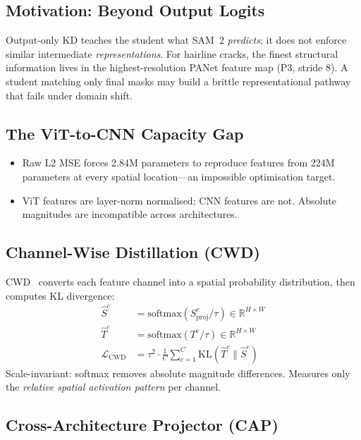 \documentclass[12pt,a4paper]{article}
\begin{document}
\subsection{Motivation: Beyond Output Logits}

Output-only KD teaches the student what SAM~2 \emph{predicts}; it does not
enforce similar intermediate \emph{representations}.
For hairline cracks, the finest structural information lives in the
highest-resolution PANet feature map (P3, stride 8).
A student matching only final masks may build a brittle representational pathway
that fails under domain shift.

\subsection{The ViT-to-CNN Capacity Gap}

\begin{itemize}
  \item Raw L2 MSE forces 2.84M parameters to reproduce features from 224M
    parameters at every spatial location---an impossible optimisation target.
  \item ViT features are layer-norm normalised; CNN features are not.
    Absolute magnitudes are incompatible across architectures.
\end{itemize}

\subsection{Channel-Wise Distillation (CWD)}

CWD~\cite{shu2021cwd} converts each feature channel into a spatial probability
distribution, then computes KL divergence:
\begin{align}
\hat{S}^c &= \mathrm{softmax}(S^c_\text{proj}/\tau)\in\mathbb{R}^{H\times W} \\
\hat{T}^c &= \mathrm{softmax}(T^c/\tau)\in\mathbb{R}^{H\times W} \\
\mathcal{L}_\text{CWD} &= \tau^2\cdot\frac{1}{C}\sum_{c=1}^C\mathrm{KL}(\hat{T}^c\|\hat{S}^c)
\end{align}
Scale-invariant: softmax removes absolute magnitude differences.
Measures only the \emph{relative spatial activation pattern} per channel.

\subsection{Cross-Architecture Projector (CAP)}
\end{document}
